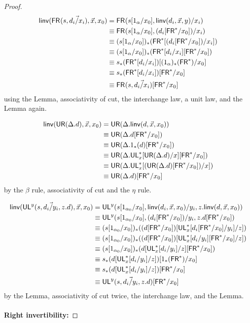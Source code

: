 \begin{proof}
\begin{align*}
\mathsf{linv}(\mathsf{FR}_{}(s,\vec{d_i/x_i}),\vec{x},x_0) 
&= \mathsf{FR}_{}(s[1_\alpha/x_0],{{\mathsf{linv}(d_i,\vec{x},y)}/x_i}) \\
&\equiv \mathsf{FR}_{}(s[1_\alpha/x_0],(d_i[\mathsf{FR}^*/x_0])/x_i) \\
&\equiv (s[1_\alpha/x_0])_*(\mathsf{FR}^*[(d_i[\mathsf{FR}^*/x_0])/x_i]) \\
&\equiv (s[1_\alpha/x_0])_*(\mathsf{FR}^*[d_i/x_i][\mathsf{FR}^*/x_0]) \\
&\equiv s_*(\mathsf{FR}^*[d_i/x_i])[(1_\alpha)_*(\mathsf{FR}^*)/x_0] \\
&\equiv s_*(\mathsf{FR}^*[d_i/x_i])[\mathsf{FR}^*/x_0] \\
&\equiv \mathsf{FR}_{}(s,\vec{d_i/x_i})[\mathsf{FR}^*/x_0]
\end{align*}
using the Lemma, associativity of cut, the interchange law, a unit law, and the Lemma again.

\begin{align*}
\mathsf{linv}(\mathsf{UR}(\Delta.d),\vec{x},x_0) 
&= \mathsf{UR}(\Delta.\mathsf{linv}(d,\vec{x},x_0)) \\
&\equiv \mathsf{UR}(\Delta.d[\mathsf{FR}^*/x_0]) \\
&\equiv \mathsf{UR}(\Delta.1_*(d)[\mathsf{FR}^*/x_0]) \\
&\equiv \mathsf{UR}(\Delta.\mathsf{UL}^*_{x}[\mathsf{UR}(\Delta.d)/x][\mathsf{FR}^*/x_0]) \\
&\equiv \mathsf{UR}(\Delta.\mathsf{UL}^*_{x}[(\mathsf{UR}(\Delta.d)[\mathsf{FR}^*/x_0])/x])\\
&\equiv \mathsf{UR}(\Delta.d)[\mathsf{FR}^*/x_0]
\end{align*}
by the $\beta$ rule, associativity of cut and the $\eta$ rule.

\begin{align*}
\mathsf{linv}(\mathsf{UL}^{y}_{}(s,\vec{d_i/y_i},z.d),\vec{x},x_0) 
&= \mathsf{UL}^{y}_{}(s[1_{\alpha_0}/x_0],\mathsf{linv}(d_i,\vec{x},x_0)/y_i,z.\mathsf{linv}(d,\vec{x},x_0)) \\
&\equiv \mathsf{UL}^{y}_{}(s[1_{\alpha_0}/x_0],(d_i[\mathsf{FR}^*/x_0])/y_i,z.d[\mathsf{FR}^*/x_0]) \\
&\equiv (s[1_{\alpha_0}/x_0])_*((d[\mathsf{FR}^*/x_0])[\mathsf{UL}^*_{x}[d_i[\mathsf{FR}^*/x_0]/y_i]/z]) \\
&\equiv (s[1_{\alpha_0}/x_0])_*((d[\mathsf{FR}^*/x_0])[\mathsf{UL}^*_{x}[d_i/y_i][\mathsf{FR}^*/x_0]/z]) \\
&\equiv (s[1_{\alpha_0}/x_0])_*(d[\mathsf{UL}^*_{x}[d_i/y_i]/z][\mathsf{FR}^*/x_0]) \\
&\equiv s_*(d[\mathsf{UL}^*_{x}[d_i/y_i]/z])[1_*(\mathsf{FR}^*)/x_0] \\
&\equiv s_*(d[\mathsf{UL}^*_{x}[d_i/y_i]/z])[\mathsf{FR}^*/x_0] \\
&\equiv \mathsf{UL}^{y}_{}(s,\vec{d_i/y_i},z.d)[\mathsf{FR}^*/x_0]
\end{align*}
by the Lemma, associativity of cut twice, the interchange law, and the Lemma.
\\~\\
\textbf{Right invertibility:}


\end{proof}

